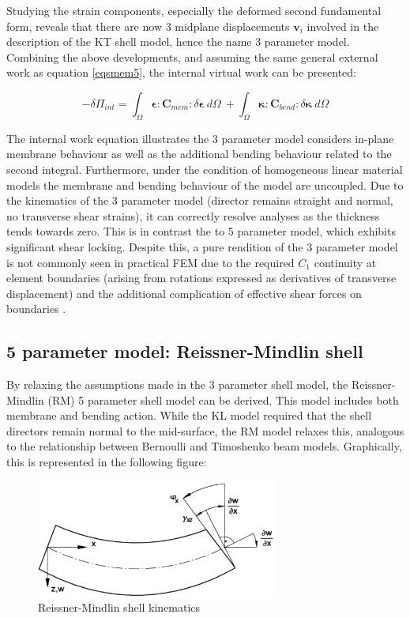Studying the strain components, especially the deformed second fundamental form, reveals that there are now 3 midplane displacements $\mathbf{v}_i$ involved in the description of the KT shell model, hence the name 3 parameter model. \\

Combining the above developments, and assuming the same general external work as equation \eqref{eqsmem5}, the internal virtual work can be presented:

\begin{equation} 
-\delta\Pi_{int} = 
\int_\Omega
\boldsymbol{\epsilon}
:
\mathbf{C}_{mem}
:
\delta \boldsymbol{\epsilon}\ d \Omega\ 
+
\int_\Omega
\boldsymbol{\kappa}
:
\mathbf{C}_{bend}
:
\delta \boldsymbol{\kappa}\ 
d \Omega
\label{eqskt9}
\end{equation}

The internal work equation illustrates the 3 parameter model considers in-plane membrane behaviour as well as the additional bending behaviour related to the second integral. Furthermore, under the condition of homogeneous linear material models the membrane and bending behaviour of the model are uncoupled. Due to the kinematics of the 3 parameter model (director remains straight and normal, no transverse shear strains), it can correctly resolve analyses as the thickness tends towards zero. This is in contrast the to 5 parameter model, which exhibits significant shear locking. Despite this, a pure rendition of the 3 parameter model is not commonly seen in practical FEM due to the required $C_1$ continuity at element boundaries (arising from rotations expressed as derivatives of transverse displacement) and the additional complication of effective shear forces on boundaries \cite{BischLitBook04}.


\subsection{5 parameter model: Reissner-Mindlin shell}

By relaxing the assumptions made in the 3 parameter shell model, the Reissner-Mindlin (RM) 5 parameter shell model can be derived. This model includes both membrane and bending action. While the KL model required that the shell directors remain normal to the mid-surface, the RM model relaxes this, analogous to the relationship between Bernoulli and Timoshenko beam models. Graphically, this is represented in the following figure:

\begin{figure}[H]
	\centering
	\def\svgwidth{\columnwidth}
	\includegraphics[width=8cm]{images/timoshenkobeam.png}
	\caption{Reissner-Mindlin shell kinematics \cite{Bletz16}}
	\label{thickshellkine1}
\end{figure}

